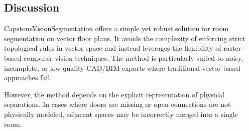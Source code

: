 \documentclass{article}
\begin{document}
\subsection{Discussion}

CapstoneVisionSegmentation offers a simple yet robust solution for room segmentation on vector floor plans. It avoids the complexity of enforcing strict topological rules in vector space and instead leverages the flexibility of raster-based computer vision techniques. The method is particularly suited to noisy, incomplete, or low-quality CAD/BIM exports where traditional vector-based approaches fail.

However, the method depends on the explicit representation of physical separations. In cases where doors are missing or open connections are not physically modeled, adjacent spaces may be incorrectly merged into a single room.
\end{document}
